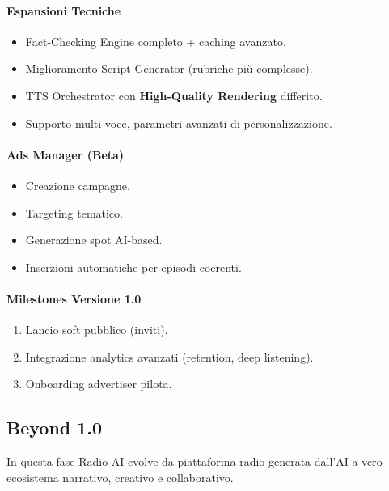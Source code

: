 \documentclass[11pt,a4paper]{article}
\begin{document}
\paragraph{Espansioni Tecniche}
\begin{itemize}
    \item Fact-Checking Engine completo + caching avanzato.
    \item Miglioramento Script Generator (rubriche più complesse).
    \item TTS Orchestrator con \textbf{High-Quality Rendering} differito.
    \item Supporto multi-voce, parametri avanzati di personalizzazione.
\end{itemize}

\paragraph{Ads Manager (Beta)}
\begin{itemize}
    \item Creazione campagne.
    \item Targeting tematico.
    \item Generazione spot AI-based.
    \item Inserzioni automatiche per episodi coerenti.
\end{itemize}

\paragraph{Milestones Versione 1.0}
\begin{enumerate}
    \item Lancio soft pubblico (inviti).
    \item Integrazione analytics avanzati (retention, deep listening).
    \item Onboarding advertiser pilota.
\end{enumerate}


\subsection{Beyond 1.0}

In questa fase Radio-AI evolve da piattaforma radio generata dall’AI a vero ecosistema narrativo, creativo e collaborativo.
\end{document}
